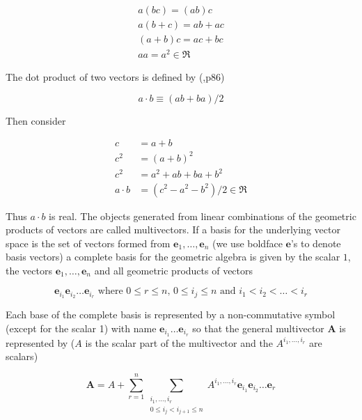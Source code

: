 \documentclass[12pt]{report}
\newcommand{\bm}[1]{\boldsymbol{#1}}
\newcommand{\lp}{\left (}
\newcommand{\rp}{\right )}
\newcommand{\eb}{\bm{e}}
\begin{document}
  \begin{equation}
  \begin{array}{c}
  a\lp bc \rp = \lp ab \rp c \\
  a\lp b+c \rp = ab+ac \\
  \lp a + b \rp c = ac+bc \\
  aa = a^{2} \in \Re
  \end{array}
  \end{equation}

The dot product of two vectors is defined by (\cite{Doran},p86)

  \begin{equation}
     a\cdot b \equiv (ab+ba)/2
  \end{equation}

Then consider

  \begin{align}
     c &= a+b \\
     c^{2} &= (a+b)^{2} \\
     c^{2} &= a^{2}+ab+ba+b^{2} \\
     a\cdot b &= (c^{2}-a^{2}-b^{2})/2 \in \Re
  \end{align}

Thus $a\cdot b$  is real.  The objects generated from linear combinations
of the geometric products of vectors are called multivectors.  If a basis for
the underlying vector space is the set of vectors formed from $\eb_{1},\dots,\eb_{n}$ (we use
boldface $\eb$'s to denote basis vectors)
a complete basis for the geometric algebra is given by the scalar $1$, the vectors $\eb_{1},\dots,\eb_{n}$
and all geometric products of vectors

   \begin{equation}
      \eb_{i_{1}}\eb_{i_{2}}\dots \eb_{i_{r}} \mbox{ where } 0\le r \le n\mbox{, }0 \le i_{j} \le n \mbox{ and } i_{1}<i_{2}<\dots<i_{r}
   \end{equation}

Each base of the complete basis is represented by a non-commutative symbol (except for the scalar 1)
with name $\eb_{i_{1}}\dots \eb_{i_{r}}$ so that the general multivector $\bm{A}$ is represented by
($A$ is the scalar part of the multivector and the $A^{i_{1},\dots,i_{r}}$ are scalars)

   \begin{equation}
      \bm{A} = A + \sum_{r=1}^{n}\sum_{\substack{i_{1},\dots,i_{r}\\ 0\le i_{j}<i_{j+1} \le n}}
               A^{i_{1},\dots,i_{r}}\eb_{i_{1}}\eb_{i_{2}}\dots \eb_{r}
   \end{equation}
\end{document}
